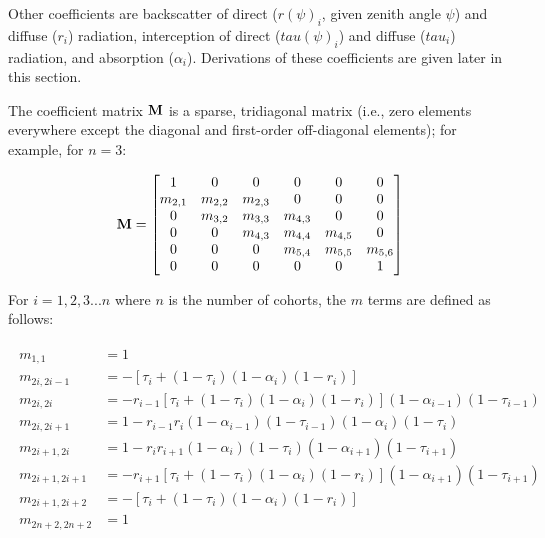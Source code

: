 Other coefficients are
backscatter of direct ($r(\psi)_{i}$, given zenith angle $\psi$) and diffuse ($r_{i}$) radiation,
interception of direct ($tau(\psi)_{i}$) and diffuse ($tau_{i}$) radiation,
and absorption ($\alpha_{i}$).
Derivations of these coefficients are given later in this section.

The coefficient matrix $\mathbf{M}$ is a sparse, tridiagonal matrix (i.e., zero elements everywhere except the diagonal and first-order off-diagonal elements); for example, for $n=3$:

\begin{equation}
  \mathbf{M} = \begin{bmatrix}
    1 & 0 & 0 & 0 & 0 & 0 \\
    m_{2,1} & m_{2,2} & m_{2,3} & 0 & 0 & 0 \\
    0 & m_{3,2} & m_{3,3} & m_{4,3} & 0 & 0 \\
    0 & 0 & m_{4,3} & m_{4,4} & m_{4,5} & 0 \\
    0 & 0 & 0 & m_{5,4} & m_{5,5} & m_{5,6} \\
    0 & 0 & 0 & 0 & 0 & 1 \\
  \end{bmatrix}
\end{equation}

For $i = 1,2,3...n$ where $n$ is the number of cohorts, the $m$ terms are defined as follows:

\begin{align}
  \begin{split}
    m_{1,1} &= 1\\
    m_{2i,2i-1} &= - \left[ \tau_i + (1 - \tau_i)(1 - \alpha_i)(1 - r_i) \right]\\
    m_{2i,2i} &= -r_{i-1} \left[ \tau_i + (1 - \tau_i)(1 - \alpha_i)(1 - r_i) \right] (1 - \alpha_{i-1})(1 - \tau_{i-1})\\
    m_{2i,2i+1} &= 1 - r_{i-1} r_i (1 - \alpha_{i-1})(1 - \tau_{i-1})(1 - \alpha_i)(1 - \tau_i)\\
    m_{2i+1,2i} &= 1 - r_i r_{i+1} (1 - \alpha_i)(1 - \tau_i)(1 - \alpha_{i+1})(1 - \tau_{i+1})\\
    m_{2i+1,2i+1} &= -r_{i+1} \left[ \tau_i + (1 - \tau_i)(1 - \alpha_i)(1 - r_i) \right] (1 - \alpha_{i+1})(1 - \tau_{i+1})\\
    m_{2i+1,2i+2} &= - \left[ \tau_i + (1 - \tau_i)(1 - \alpha_i)(1 - r_i) \right]\\
    m_{2n+2,2n+2} &= 1
  \end{split}
\end{align}

